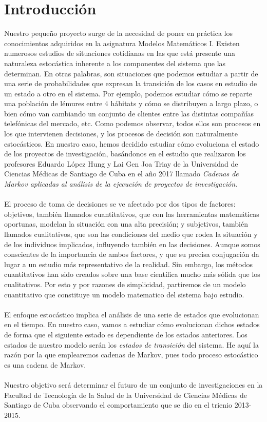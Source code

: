 \documentclass[10pt,a4paper]{article}
\begin{document}
\section{Introducción}
Nuestro pequeño proyecto surge de la necesidad de poner en práctica los conocimientos adquiridos en la asignatura Modelos Matemáticos I. Existen numerosos estudios de situaciones cotidianas en las que está presente una naturaleza estocástica inherente a los componentes del sistema que las determinan. En otras palabras, son situaciones que podemos estudiar a partir de una serie de probabilidades que expresan la transición de los casos en estudio de un estado a otro en el sistema. Por ejemplo, podemos estudiar cómo se reparte una población de lémures entre 4 hábitats y cómo se distribuyen a largo plazo, o bien cómo van cambiando un conjunto de clientes entre las distintas compañías telefónicas del mercado, etc. Como podemos observar, todos ellos son procesos en los que intervienen decisiones, y los procesos de decisión son naturalmente estocásticos. En nuestro caso, hemos decidido estudiar cómo evoluciona el estado de los proyectos de investigación, basándonos en el estudio que realizaron los profesores Eduardo López Hung y Lai Gen Joa Triay de la Universidad de Ciencias Médicas de Santiago de Cuba en el año 2017 llamado \textit{Cadenas de Markov aplicadas al análisis de la ejecución de proyectos de investigación}.
\\
\\
El proceso de toma de decisiones se ve afectado por dos tipos de factores: objetivos, también llamados cuantitativos, que con las herramientas matemáticas oportunas, modelan la situación con una alta precisión; y subjetivos, también llamados cualitativos, que son las condiciones del medio que rodea la situación y de los individuos implicados, influyendo también en las decisiones. Aunque somos conscientes de la importancia de ambos factores, y que su precisa conjugación da lugar a un estudio más representativo de la realidad. Sin embargo, los métodos cuantitativos han sido creados sobre una base científica mucho más sólida que los cualitativos. Por esto y por razones de simplicidad, partiremos de un modelo cuantitativo que constituye un modelo matematico del sistema bajo estudio.
\\
\\
El enfoque estocástico implica el análisis de una serie de estados que evolucionan en el tiempo. En nuestro caso, vamos a estudiar cómo evolucionan dichos estados de forma que el siguiente estado es dependiente de los estados anteriores. Los estados de nuestro modelo serán los \textit{estados de transición} del sistema. He aquí la razón por la que emplearemos cadenas de Markov, pues todo proceso estocástico es una cadena de Markov.
\\
\\
Nuestro objetivo será determinar el futuro de un conjunto de investigaciones en la Facultad de Tecnología de la Salud de la Universidad de Ciencias Médicas de Santiago de Cuba observando el comportamiento que se dio en el trienio 2013-2015.
\newpage
\end{document}
